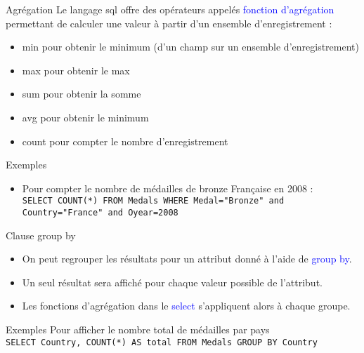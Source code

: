 \documentclass[10pt]{beamer}
\begin{document}
\begin{frame}{\Ctitle}{\stitle}
	\begin{alertblock}{Agrégation}
		Le langage {\sc sql} offre des opérateurs appelés \textcolor{blue}{fonction d'agrégation} permettant de calculer une valeur à partir d'un ensemble d'enregistrement :
		\begin{itemize}
			\item<2-> {\sc min} pour obtenir le minimum (d'un champ sur un ensemble d'enregistrement)
			\item<3-> {\sc max} pour obtenir le max
			\item<4-> {\sc sum} pour obtenir la somme
			\item<5-> {\sc avg} pour obtenir le minimum
			\item<6-> {\sc count} pour compter le nombre d'enregistrement
		\end{itemize}
	\end{alertblock}
	\begin{exampleblock}{Exemples}
		\begin{itemize}
			\item<7-> Pour compter le nombre de médailles de bronze Française en 2008 :\\
				\onslide<8->\texttt{SELECT COUNT(*) FROM Medals WHERE Medal="Bronze" and Country="France" and Oyear=2008}
		\end{itemize}
	\end{exampleblock}
\end{frame}

\begin{frame}{\Ctitle}{\stitle}
	\begin{alertblock}{Clause {\sc group by}}
		\begin{itemize}
			\item<1-> On peut regrouper les résultats pour un attribut donné à l'aide de \textcolor{blue}{\sc group by}.
			\item<2-> Un seul résultat sera affiché pour chaque valeur possible de l'attribut.
			\item<3-> Les fonctions d'agrégation dans le \textcolor{blue}{\sc select} s'appliquent alors à chaque groupe.
		\end{itemize}
	\end{alertblock}
	\begin{exampleblock}{Exemples}
		\onslide<4->Pour afficher le nombre total de médailles par pays\\
		\onslide<5->\texttt{SELECT Country, COUNT(*) AS total FROM Medals GROUP BY Country}
	\end{exampleblock}
\end{frame}
\end{document}
